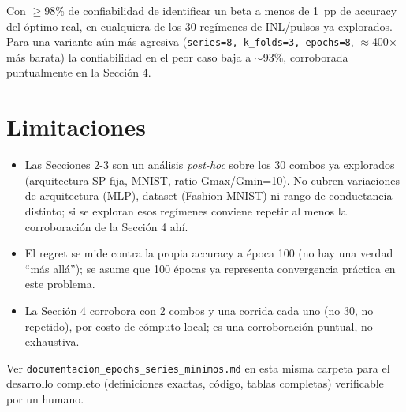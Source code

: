 \documentclass[11pt]{article}
\begin{document}
Con $\geq$98\% de confiabilidad de identificar un beta a menos de 1~pp de accuracy del
óptimo real, en cualquiera de los 30 regímenes de INL/pulsos ya explorados. Para una
variante aún más agresiva (\texttt{series=8, k\_folds=3, epochs=8}, $\approx$400$\times$
más barata) la confiabilidad en el peor caso baja a $\sim$93\%, corroborada puntualmente
en la Sección 4.

\section{Limitaciones}

\begin{itemize}
\item Las Secciones 2-3 son un análisis \emph{post-hoc} sobre los 30 combos ya
explorados (arquitectura SP fija, MNIST, ratio Gmax/Gmin=10). No cubren variaciones de
arquitectura (MLP), dataset (Fashion-MNIST) ni rango de conductancia distinto; si se
exploran esos regímenes conviene repetir al menos la corroboración de la Sección 4 ahí.
\item El regret se mide contra la propia accuracy a época 100 (no hay una verdad ``más
allá''); se asume que 100 épocas ya representa convergencia práctica en este problema.
\item La Sección 4 corrobora con 2 combos y una corrida cada uno (no 30, no repetido),
por costo de cómputo local; es una corroboración puntual, no exhaustiva.
\end{itemize}

Ver \texttt{documentacion\_epochs\_series\_minimos.md} en esta misma carpeta para el
desarrollo completo (definiciones exactas, código, tablas completas) verificable por un
humano.
\end{document}

